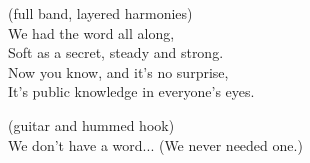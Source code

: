 \begin{lyrics}
 (full band, layered harmonies)\\
We had the word all along,\\
Soft as a secret, steady and strong.\\
Now you know, and it's no surprise,\\
It's public knowledge in everyone's eyes.

 (guitar and hummed hook)\\
We don't have a word...
(We never needed one.)
\end{lyrics}

